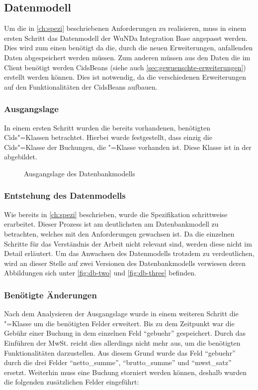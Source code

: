 \subsection{Datenmodell}
Um die in \autoref{ch:spezi} beschriebenen Anforderungen zu realisieren, muss in einem ersten Schritt das Datenmodell der \ac{WuNDa} Integration Base angepasst werden.
Dies wird zum einen benötigt da die, durch die neuen Erweiterungen, anfallenden Daten abgespeichert werden müssen.
Zum anderen müssen aus den Daten die im Client benötigt werden CidsBeans (siehe auch \autoref{sec:gewuenschte-erweiterungen}) erstellt werden können.
Dies ist notwendig, da die verschiedenen Erweiterungen auf den Funktionalitäten der CidsBeans aufbauen.

\subsubsection{Ausgangslage}
In einem ersten Schritt wurden die bereits vorhandenen, benötigten Cids"=Klassen betrachtet. Hierbei wurde festgestellt, dass einzig die Cids"=Klasse der Buchungen, die "=Klasse vorhanden ist. Diese Klasse ist in der  abgebildet.
\begin{figure}[htb]
	\centering
	\caption{Ausgangslage des Datenbankmodells}
	\label{fig:db-billing}
\end{figure}

\subsubsection{Entstehung des Datenmodells}
Wie bereits in \autoref{ch:spezi} beschrieben, wurde die Spezifikation schrittweise erarbeitet.
Dieser Prozess ist am deutlichsten am Datenbankmodell zu betrachten, welches mit den Anforderungen gewachsen ist.
Da die einzelnen Schritte für das Verständnis der Arbeit nicht relevant sind, werden diese nicht im Detail erläutert.
Um das Anwachsen des Datenmodells trotzdem zu verdeutlichen, wird an dieser Stelle auf zwei Versionen des Datenbankmodells verwiesen deren Abbildungen sich unter \ref{fig:db-two} und \ref{fig:db-three} befinden.

\subsubsection{Benötigte Änderungen}
Nach dem Analysieren der Ausgangslage wurde in einem weiteren Schritt die "=Klasse um die benötigten Felder erweitert.
Bis zu dem Zeitpunkt war die Gebühr einer Buchung in dem einzelnen Feld "`gebuehr"' gespeichert.
Durch das Einführen der MwSt. reicht dies allerdings nicht mehr aus, um die benötigten Funktionalitäten darzustellen.
Aus diesem Grund wurde das Feld  "`gebuehr"' durch die drei Felder "`netto\_summe"', "`brutto\_summe"' und "`mwst\_satz"' ersetzt.
Weiterhin muss eine Buchung storniert werden können, deshalb wurden die folgenden zusätzlichen Felder eingeführt:

